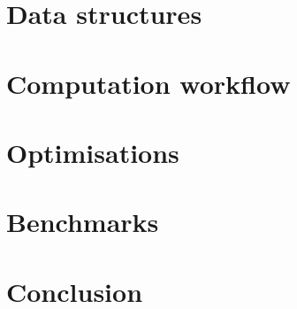 \documentclass[
 reprint,
 superscriptaddress,
 amsmath,
 amssymb,
 aps,
]{revtex4-2}
\begin{document}
\section{Data structures}


\section{\label{sec:datastreams} Computation workflow}


\section{Optimisations}

\section{\label{sec:benchmarks} Benchmarks}


\section{Conclusion}




\end{document}
